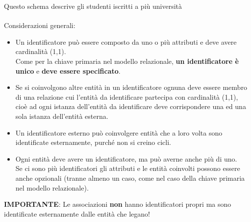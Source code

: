 \documentclass[../main.tex]{subfiles}
\begin{document}
\begin{center}
	\end{center}
	Questo schema descrive gli studenti iscritti a più università\\\\
	Considerazioni generali:
	\begin{itemize}
		\item Un identificatore può essere composto da uno o più attributi e deve avere cardinalità (1,1). \\
		Come per la chiave primaria nel modello relazionale, \textbf{un identificatore è unico} e \textbf{deve essere specificato}.
		\item Se si coinvolgono altre entità in un identificatore ognuna deve essere membro di una relazione cui l’entità da identificare partecipa con cardinalità (1,1), cioè ad ogni istanza dell’entità da identificare deve corrispondere una ed una sola istanza dell’entità esterna.
		\item Un identificatore esterno può coinvolgere entità che a loro volta sono identificate esternamente, purché non si creino cicli.
		\item Ogni entità deve avere un identificatore, ma può averne anche più di uno. \\
		Se ci sono più identificatori gli attributi e le entità coinvolti possono essere anche opzionali (tranne almeno un caso, come nel caso della chiave primaria nel modello relazionale).
	\end{itemize}
	\textbf{IMPORTANTE}: Le associazioni \textbf{non} hanno identificatori propri ma sono identificate esternamente dalle entità che legano!
\end{document}
